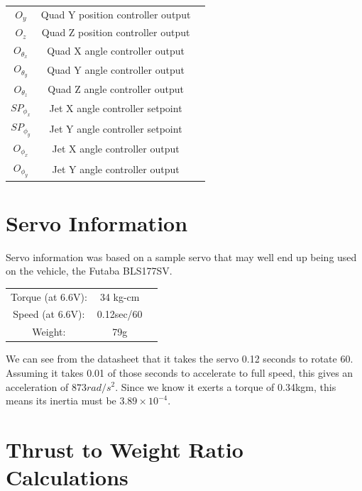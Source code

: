 \documentclass[10pt]{article}
\begin{document}
\begin{center}
\begin{longtable}{|ccc|}
    $O_y$ & Quad Y position controller output & \\
    $O_z$ & Quad Z position controller output & \\
    $O_{\theta_x}$ & Quad X angle controller output & \\
    $O_{\theta_y}$ & Quad Y angle controller output & \\
    $O_{\theta_z}$ & Quad Z angle controller output & \\
    $SP_{\phi_x}$ & Jet X angle controller setpoint & \\
    $SP_{\phi_y}$ & Jet Y angle controller setpoint & \\
    $O_{\phi_x}$ & Jet X angle controller output & \\
    $O_{\phi_y}$ & Jet Y angle controller output & \\
    \hline
\end{longtable}
\end{center}

\section{Servo Information} \label{app:servo_info}
Servo information was based on a sample servo that may well end up being used on the vehicle, the Futaba BLS177SV.

\begin{center}
\begin{tabular}{ccc}
    Torque (at 6.6V): & 34 kg-cm \\
    Speed (at 6.6V): & 0.12sec/60\textdegree{} \\
    Weight: & 79g \\
\end{tabular}
\end{center}

We can see from the datasheet that it takes the servo 0.12 seconds to rotate 60\textdegree{}. Assuming it takes 0.01 of those seconds to accelerate to full speed, this gives an acceleration of $873rad/s^2$. Since we know it exerts a torque of 0.34kgm, this means its inertia must be $3.89\times10^{-4}$.

\section{Thrust to Weight Ratio Calculations} \label{app:thrust_to_weight}
\end{document}
